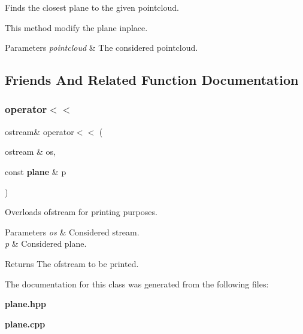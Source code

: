 Finds the closest plane to the given pointcloud. 

This method modify the plane inplace. 
\begin{DoxyParams}{Parameters}
{\em pointcloud} & The considered pointcloud. \\
\hline
\end{DoxyParams}


\subsection{Friends And Related Function Documentation}
\mbox{\label{classplane_ad9726324e2752901973bf9cdc8ae8c39}} 
\subsubsection{operator$<$$<$}
{\footnotesize\ttfamily ostream\& operator$<$$<$ (\begin{DoxyParamCaption}\item[{ostream \&}]{os,  }\item[{const \textbf{ plane} \&}]{p }\end{DoxyParamCaption})\hspace{0.3cm}{\ttfamily [friend]}}



Overloads ofstream for printing purposes. 


\begin{DoxyParams}{Parameters}
{\em os} & Considered stream. \\
\hline
{\em p} & Considered plane. \\
\hline
\end{DoxyParams}
\begin{DoxyReturn}{Returns}
The ofstream to be printed. 
\end{DoxyReturn}


The documentation for this class was generated from the following files\+:\begin{DoxyCompactItemize}
\item 
\textbf{ plane.\+hpp}\item 
\textbf{ plane.\+cpp}\end{DoxyCompactItemize}
